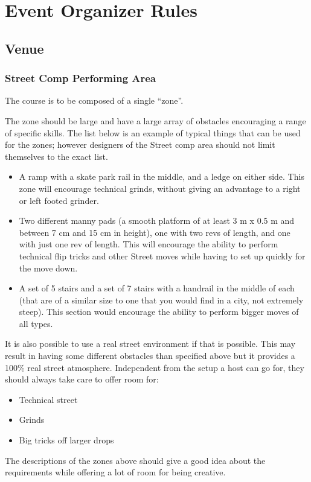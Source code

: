 \chapter{Event Organizer Rules}

\section{Venue}

\subsection{Street Comp Performing Area \label{sec:flat-street_street-performing-area}}
The course is to be composed of a single ``zone''.

The zone should be large and have a large array of obstacles encouraging a range of specific skills.
The list below is an example of  typical things that can be used for the zones; however designers of the Street comp area should not limit themselves to the exact list.

\begin{itemize}
\item A ramp with a skate park rail in the middle, and a ledge on either side.
This zone will encourage technical grinds, without giving an advantage to a right or left footed grinder.
\item Two different manny pads (a smooth platform of at least 3 m x 0.5 m and between 7 cm and 15 cm in height), one with two revs of length, and one with just one rev of length.
This will encourage the ability to perform technical flip tricks and other Street moves while having to set up quickly for the move down.
\item A set of 5 stairs and a set of 7 stairs with a handrail in the middle of each (that are of a similar size to one that you would find in a city, not extremely steep).
This section would encourage the ability to perform bigger moves of all types.
\end{itemize}

It is also possible to use a real street environment if that is possible.
This may result in having some different obstacles than specified above but it provides a 100\% real street atmosphere.
Independent from the setup a host can go for, they should always take care to offer room for:
\begin{itemize}
\item Technical street
\item Grinds
\item Big tricks off larger drops
\end{itemize}
The descriptions of the zones above should give a good idea about the requirements while offering a lot of room for being creative.

